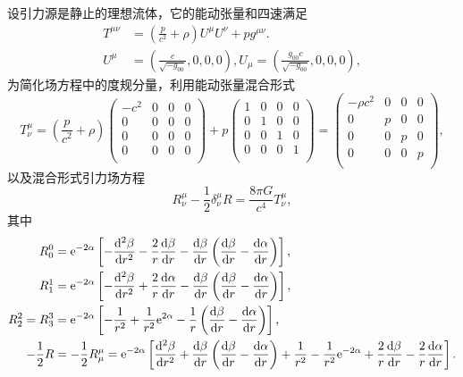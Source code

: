 \documentclass[11pt, a4paper, oneside, onecolumn]{ctexart}
\numberwithin{equation}{subsection}
\begin{document}
设引力源是静止的理想流体，它的能动张量和四速满足
\begin{align}
T^{\mu\nu}&=\left(\frac{p}{c^{2}}+\rho\right)U^{\mu}U^{\nu}+pg^{\mu\nu}.\\
U^{\mu}&=\left(\frac{c}{\sqrt{-g_{00}}},0,0,0\right),U_{\mu}=\left(\frac{g_{00}c}{\sqrt{-g_{00}}},0,0,0\right),
\end{align}
为简化场方程中的度规分量，利用能动张量混合形式
\begin{equation}
T^{\mu}_{\nu}=\left(\frac{p}{c^{2}}+\rho\right)
\begin{pmatrix}
-c^{2} & 0 & 0 & 0\\
0 & 0 & 0 & 0\\
0 & 0 & 0 & 0\\
0 & 0 & 0 & 0\\
\end{pmatrix}
+p\begin{pmatrix}
1 & 0 & 0 & 0\\
0 & 1 & 0 & 0\\
0 & 0 & 1 & 0\\
0 & 0 & 0 & 1\\
\end{pmatrix}
=\begin{pmatrix}
-\rho c^{2} & 0 & 0 & 0\\
0 & p & 0 & 0\\
0 & 0 & p & 0\\
0 & 0 & 0 & p\\
\end{pmatrix},
\end{equation}
以及混合形式引力场方程
\begin{equation}
R^{\mu}_{\nu}-\frac{1}{2}\delta{}^{\mu}_{\nu}R=\frac{8\pi G}{c^{4}}T^{\mu}_{\nu},
\end{equation}
其中
\begin{align}
R^{0}_{0}&=\mathrm{e}^{-2\alpha}\left[-\frac{\mathrm{d}^{2}\beta}{\mathrm{d}r^{2}}-\frac{2}{r}\frac{\mathrm{d}\beta}{\mathrm{d}r}-\frac{\mathrm{d}\beta}{\mathrm{d}r}\left(\frac{\mathrm{d}\beta}{\mathrm{d}r}-\frac{\mathrm{d}\alpha}{\mathrm{d}r}\right)\right],\notag\\
R^{1}_{1}&=\mathrm{e}^{-2\alpha}\left[-\frac{\mathrm{d}^{2}\beta}{\mathrm{d}r^{2}}+\frac{2}{r}\frac{\mathrm{d}\alpha}{\mathrm{d}r}-\frac{\mathrm{d}\beta}{\mathrm{d}r}\left(\frac{\mathrm{d}\beta}{\mathrm{d}r}-\frac{\mathrm{d}\alpha}{\mathrm{d}r}\right)\right],\notag\\
R^{2}_{2}=R^{3}_{3}&=\mathrm{e}^{-2\alpha}\left[-\frac{1}{r^{2}}+\frac{1}{r^{2}}\mathrm{e}^{2\alpha}-\frac{1}{r}\left(\frac{\mathrm{d}\beta}{\mathrm{d}r}-\frac{\mathrm{d}\alpha}{\mathrm{d}r}\right)\right],\notag\\
-\frac{1}{2}R&=-\frac{1}{2}R^{\mu}_{\mu}=\mathrm{e}^{-2\alpha}\left[\frac{\mathrm{d}^{2}\beta}{\mathrm{d}r^{2}}+\frac{\mathrm{d}\beta}{\mathrm{d}r}\left(\frac{\mathrm{d}\beta}{\mathrm{d}r}-\frac{\mathrm{d}\alpha}{\mathrm{d}r}\right)+\frac{1}{r^{2}}-\frac{1}{r^{2}}\mathrm{e}^{-2\alpha}+\frac{2}{r}\frac{\mathrm{d}\beta}{\mathrm{d}r}-\frac{2}{r}\frac{\mathrm{d}\alpha}{\mathrm{d}r}\right].\notag
\end{align}
\end{document}
